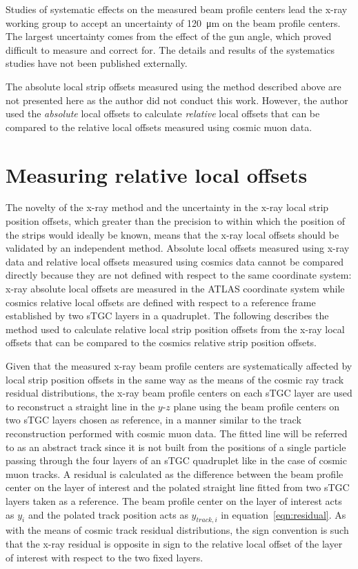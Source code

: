 Studies of systematic effects on the measured beam profile centers lead the x-ray working group to accept an uncertainty of \SI{120}{\micro\meter} on the beam profile centers. The largest uncertainty comes from the effect of the gun angle, which proved difficult to measure and correct for. The details and results of the systematics studies have not been published externally. 

The absolute local strip offsets measured using the method described above are not presented here as the author did not conduct this work. However, the author used the {\em absolute} local offsets to calculate {\em relative} local offsets that can be compared to the relative local offsets measured using cosmic muon data.

\section{Measuring relative local offsets}

The novelty of the x-ray method and the uncertainty in the x-ray local strip position offsets, which greater than the precision to within which the position of the strips would ideally be known, means that the x-ray local offsets should be validated by an independent method. Absolute local offsets measured using x-ray data and relative local offsets measured using cosmics data cannot be compared directly because they are not defined with respect to the same coordinate system: x-ray absolute local offsets are measured in the ATLAS coordinate system while cosmics relative local offsets are defined with respect to a reference frame established by two sTGC layers in a quadruplet. The following describes the method used to calculate relative local strip position offsets from the x-ray local offsets that can be compared to the cosmics relative strip position offsets.

Given that the measured x-ray beam profile centers are systematically affected by local strip position offsets in the same way as the means of the cosmic ray track residual distributions, the x-ray beam profile centers on each sTGC layer are used to reconstruct a straight line in the $y$-$z$ plane using the beam profile centers on two sTGC layers chosen as reference, in a manner similar to the track reconstruction performed with cosmic muon data. The fitted line will be referred to as an abstract track since it is not built from the positions of a single particle passing through the four layers of an sTGC quadruplet like in the case of cosmic muon tracks. A residual is calculated as the difference between the beam profile center on the layer of interest and the polated straight line fitted from two sTGC layers taken as a reference. The beam profile center on the layer of interest acts as $y_{i}$ and the polated track position acts as $y_{track, i}$ in equation~\ref{eqn:residual}.  As with the means of cosmic track residual distributions, the sign convention is such that the x-ray residual is opposite in sign to the relative local offset of the layer of interest with respect to the two fixed layers. 

